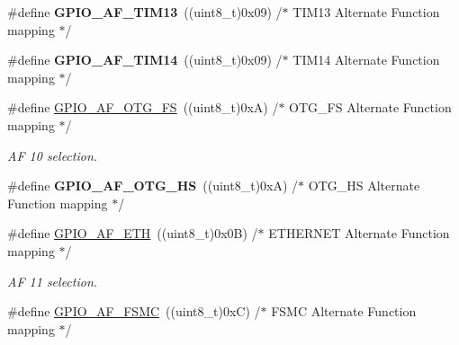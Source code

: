 \begin{DoxyCompactItemize}
\item 
\hypertarget{group___g_p_i_o___alternat__function__selection__define_gae89e027f14289052d5c51b4c96f79702}{\#define {\bfseries G\-P\-I\-O\-\_\-\-A\-F\-\_\-\-T\-I\-M13}~((uint8\-\_\-t)0x09)  /$\ast$ T\-I\-M13 Alternate Function mapping $\ast$/}\label{group___g_p_i_o___alternat__function__selection__define_gae89e027f14289052d5c51b4c96f79702}

\item 
\hypertarget{group___g_p_i_o___alternat__function__selection__define_ga9341da4e7ba3921ed1a683df3ec0e41b}{\#define {\bfseries G\-P\-I\-O\-\_\-\-A\-F\-\_\-\-T\-I\-M14}~((uint8\-\_\-t)0x09)  /$\ast$ T\-I\-M14 Alternate Function mapping $\ast$/}\label{group___g_p_i_o___alternat__function__selection__define_ga9341da4e7ba3921ed1a683df3ec0e41b}

\item 
\hypertarget{group___g_p_i_o___alternat__function__selection__define_gaeba0aeefec841e505170efc7762ae588}{\#define \hyperlink{group___g_p_i_o___alternat__function__selection__define_gaeba0aeefec841e505170efc7762ae588}{G\-P\-I\-O\-\_\-\-A\-F\-\_\-\-O\-T\-G\-\_\-\-F\-S}~((uint8\-\_\-t)0x\-A)  /$\ast$ O\-T\-G\-\_\-\-F\-S Alternate Function mapping $\ast$/}\label{group___g_p_i_o___alternat__function__selection__define_gaeba0aeefec841e505170efc7762ae588}

\begin{DoxyCompactList}\small\item\em A\-F 10 selection. \end{DoxyCompactList}\item 
\hypertarget{group___g_p_i_o___alternat__function__selection__define_gaa92d928ec3d83bfef06877092178960a}{\#define {\bfseries G\-P\-I\-O\-\_\-\-A\-F\-\_\-\-O\-T\-G\-\_\-\-H\-S}~((uint8\-\_\-t)0x\-A)  /$\ast$ O\-T\-G\-\_\-\-H\-S Alternate Function mapping $\ast$/}\label{group___g_p_i_o___alternat__function__selection__define_gaa92d928ec3d83bfef06877092178960a}

\item 
\hypertarget{group___g_p_i_o___alternat__function__selection__define_ga26cf3f30fe5154bd461b27fab58e45e2}{\#define \hyperlink{group___g_p_i_o___alternat__function__selection__define_ga26cf3f30fe5154bd461b27fab58e45e2}{G\-P\-I\-O\-\_\-\-A\-F\-\_\-\-E\-T\-H}~((uint8\-\_\-t)0x0\-B)  /$\ast$ E\-T\-H\-E\-R\-N\-E\-T Alternate Function mapping $\ast$/}\label{group___g_p_i_o___alternat__function__selection__define_ga26cf3f30fe5154bd461b27fab58e45e2}

\begin{DoxyCompactList}\small\item\em A\-F 11 selection. \end{DoxyCompactList}\item 
\hypertarget{group___g_p_i_o___alternat__function__selection__define_ga8378a89ae1a16d5ae5d315ca49a57674}{\#define \hyperlink{group___g_p_i_o___alternat__function__selection__define_ga8378a89ae1a16d5ae5d315ca49a57674}{G\-P\-I\-O\-\_\-\-A\-F\-\_\-\-F\-S\-M\-C}~((uint8\-\_\-t)0x\-C)  /$\ast$ F\-S\-M\-C Alternate Function mapping $\ast$/}\label{group___g_p_i_o___alternat__function__selection__define_ga8378a89ae1a16d5ae5d315ca49a57674}


\end{DoxyCompactItemize}
